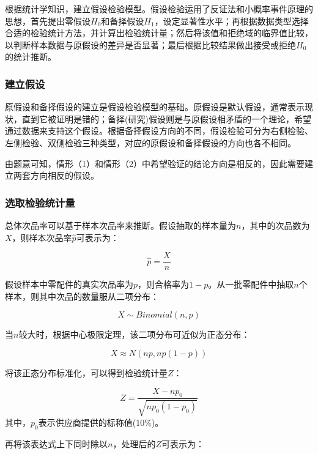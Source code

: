 \documentclass[withoutpreface,bwprint]{cumcmthesis} %
\begin{document}
根据统计学知识，建立假设检验模型。假设检验运用了反证法和小概率事件原理的思想\cite{SHHT202404019}，首先提出零假设$H_0$和备择假设$H_1$，设定显著性水平；再根据数据类型选择合适的检验统计方法，并计算出检验统计量；然后将该值和拒绝域的临界值比较，以判断样本数据与原假设的差异是否显著；最后根据比较结果做出接受或拒绝$H_0$的统计推断。

\subsubsection{建立假设}
原假设和备择假设的建立是假设检验模型的基础。原假设是默认假设，通常表示现状，直到它被证明是错的；备择(研究)假设则是与原假设相矛盾的一个理论\cite{拉森r2004基础统计学}，希望通过数据来支持这个假设。根据备择假设方向的不同，假设检验可分为右侧检验、左侧检验、双侧检验三种类型，对应的原假设和备择假设的方向也各不相同。

由题意可知，情形（1）和情形（2）中希望验证的结论方向是相反的，因此需要建立两套方向相反的假设。



\subsubsection{选取检验统计量}

总体次品率可以基于样本次品率来推断。假设抽取的样本量为$n$，其中的次品数为$X$，则样本次品率$\hat{p}$可表示为：

\begin{equation}
	\hat{p}=\frac{X}{n}
\end{equation}

假设样本中零配件的真实次品率为$p$，则合格率为$1-p$。从一批零配件中抽取$n$个样本，则其中次品的数量服从二项分布：

\begin{equation}
	X \sim Binomial(n, p)
\end{equation}

当$n$较大时，根据中心极限定理，该二项分布可近似为正态分布：

\begin{equation}
	X \approx N(n p, n p(1-p))
\end{equation}

将该正态分布标准化，可以得到检验统计量$Z$：

\begin{equation}
	Z=\frac{X-n p_0}{\sqrt{n p_0\left(1-p_0\right)}}
\end{equation}
其中，$p_0$表示供应商提供的标称值(10\%)。

再将该表达式上下同时除以$n$，处理后的$Z$可表示为：
\end{document}
